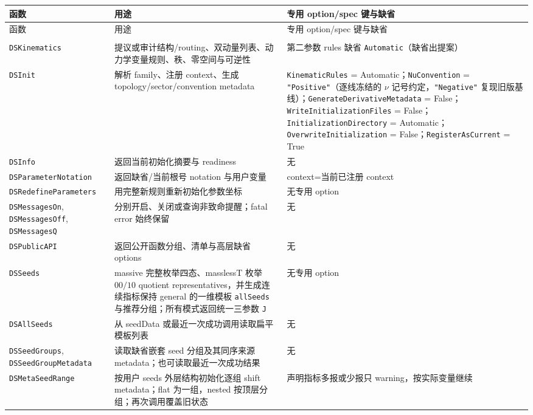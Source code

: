 ﻿\documentclass[a4paper,11pt]{article}
\begin{document}
\begingroup
\scriptsize
\renewcommand{\arraystretch}{0.98}
\begin{longtable}{@{}>{\raggedright\arraybackslash}p{}>{\raggedright\arraybackslash}p{}>{\raggedright\arraybackslash}p{}@{}}
\toprule
函数 & 用途 & 专用 option/spec 键与缺省 \\
\midrule
\endfirsthead
\toprule
函数 & 用途 & 专用 option/spec 键与缺省 \\
\midrule
\endhead
\midrule
\multicolumn{3}{r}{续下页} \\
\endfoot
\bottomrule
\endlastfoot
\texttt{DSKinematics} & 提议或审计结构/routing、双动量列表、动力学变量规则、秩、零空间与可逆性 & 第二参数 rules 缺省 \texttt{Automatic}（缺省出提案） \\
\texttt{DSInit} & 解析 family、注册 context、生成 topology/sector/convention metadata & \texttt{KinematicRules} = Automatic；\allowbreak\texttt{NuConvention} = \texttt{"Positive"}（逐线冻结的 $\nu$ 记号约定，\texttt{"Negative"} 复现旧版基线）；\allowbreak\texttt{GenerateDerivativeMetadata} = False；\allowbreak\texttt{WriteInitializationFiles} = False；\allowbreak\texttt{InitializationDirectory} = Automatic；\allowbreak\texttt{OverwriteInitialization} = False；\allowbreak\texttt{RegisterAsCurrent} = True \\
\texttt{DSInfo} & 返回当前初始化摘要与 readiness & 无 \\
\texttt{DSParameterNotation} & 返回缺省/当前根号 notation 与用户变量 & context=当前已注册 context \\
\texttt{DSRedefineParameters} & 用完整新规则重新初始化参数坐标 & 无专用 option \\
\texttt{DSMessagesOn}, \texttt{DSMessagesOff}, \texttt{DSMessagesQ} & 分别开启、关闭或查询非致命提醒；fatal error 始终保留 & 无 \\
\texttt{DSPublicAPI} & 返回公开函数分组、清单与高层缺省 options & 无 \\
\texttt{DSSeeds} & massive 完整枚举四态、masslessT 枚举 $00/10$ quotient representatives，并生成连续指标保持 general 的一维模板 \texttt{allSeeds} 与推荐分组；所有模式返回统一三参数 \texttt{J} & 无专用 option \\
\texttt{DSAllSeeds} & 从 seedData 或最近一次成功调用读取扁平模板列表 & 无 \\
\texttt{DSSeedGroups}, \texttt{DSSeedGroupMetadata} & 读取缺省嵌套 seed 分组及其同序来源 metadata；也可读取最近一次成功结果 & 无 \\
\texttt{DSMetaSeedRange} & 按用户 seeds 外层结构初始化逐组 shift metadata；flat 为一组，nested 按顶层分组；再次调用覆盖旧状态 & 声明指标多报或少报只 warning，按实际变量继续 \\

\end{longtable}
\end{document}
